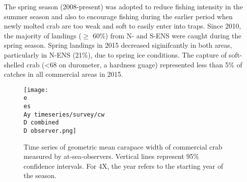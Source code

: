 \documentclass[paper=a4, fontsize=11pt]{article}
\newcommand{\D}{.}
\newcommand{\e}{/home/michelle/ecomod_data/}
\newcommand{\es}{snowcrab/}
\newcommand{\Ay}{assessments/2015/}
\begin{document}
The spring season (2008-present) was adopted to reduce fishing intensity in the summer season and also to encourage fishing during the earlier period when newly molted crab are too weak and soft to easily enter into traps. Since 2010, the majority of landings ($\geq$ 60\%) from N- and S-ENS were caught during the spring season. Spring landings in 2015 decreased siginifcantly in both areas, particularly in N-ENS (21\%), due to spring ice conditions. The capture of soft-shelled crab (<68 on durometer, a hardness guage) represented less than 5\% of catches in all commercial areas in 2015.\\

\begin{figure}[h]
    \centering
    \texttt{[image: \\e \\es \\Ay timeseries/survey/cw\\D combined\\D observer.png]}
    \caption{Time series of geometric mean carapace width of commercial crab measured by at-sea-observers. Vertical lines represent 95\% confidence intervals. For 4X, the year refers to the starting year of the season.}
\end{figure}
\end{document}
